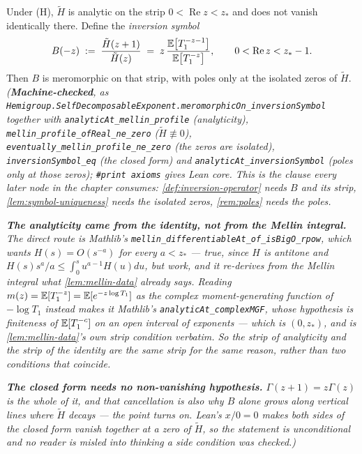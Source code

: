 \begin{lemma}\label{lem:inversion-symbol}
\leanok
Under (H), $\tilde H$ is analytic on the strip $0 < \operatorname{Re} z < z_*$ and does not
vanish identically there. Define the \emph{inversion symbol}
\[
  B(-z) \;:=\; \frac{\tilde H(z+1)}{\tilde H(z)}
  \;=\; z\,\frac{\mathbb{E}\bigl[T_1^{-z-1}\bigr]}{\mathbb{E}\bigl[T_1^{-z}\bigr]},
  \qquad 0 < \operatorname{Re} z < z_* - 1 .
\]
Then $B$ is meromorphic on that strip, with poles only at the isolated zeros of $\tilde H$.
\statusT\quad\emph{(\textbf{Machine-checked}, as
\texttt{Hemigroup.SelfDecomposableExponent.meromorphicOn\_inversionSymbol} together with
\texttt{analyticAt\_mellin\_profile} (analyticity),
\texttt{mellin\_profile\_ofReal\_ne\_zero} ($\tilde H \not\equiv 0$),
\texttt{eventually\_mellin\_profile\_ne\_zero} (the zeros are isolated),
\texttt{inversionSymbol\_eq} (the closed form) and
\texttt{analyticAt\_inversionSymbol} (poles only at those zeros);
\texttt{\#print axioms} gives Lean core. This is the clause every later
node in the chapter consumes: \ref{def:inversion-operator} needs $B$ and its strip,
\ref{lem:symbol-uniqueness} needs the isolated zeros, \ref{rem:poles} needs the poles.}

\emph{\textbf{The analyticity came from the identity, not from the Mellin integral.} The direct
route is Mathlib's \texttt{mellin\_differentiableAt\_of\_isBigO\_rpow}, which wants
$H(s) = O(s^{-a})$ for every $a < z_*$ --- true, since $H$ is antitone and
$H(s)s^a/a \le \int_0^s u^{a-1}H(u)du$, but work, and it re-derives from the Mellin integral what
\ref{lem:mellin-data} already says. Reading $m(z) = \mathbb{E}[T_1^{-z}] = \mathbb{E}[e^{-z\log T_1}]$ as the
complex moment-generating function of $-\log T_1$ instead makes it Mathlib's
\texttt{analyticAt\_complexMGF}, whose hypothesis is finiteness of $\mathbb{E}[T_1^{-c}]$ on an open
interval of exponents --- which is $(0, z_*)$, and is \ref{lem:mellin-data}'s own strip condition
verbatim. So the strip of analyticity and the strip of the identity are the \emph{same} strip for
the \emph{same} reason, rather than two conditions that coincide.}

\emph{\textbf{The closed form needs no non-vanishing hypothesis.} $\Gamma(z+1) = z\Gamma(z)$ is the
whole of it, and that cancellation is also why $B$ alone grows along vertical lines where
$\tilde H$ decays --- the point  turns on. Lean's $x/0 = 0$ makes both sides of the
closed form vanish together at a zero of $\tilde H$, so the statement is unconditional and no
reader is misled into thinking a side condition was checked.)}
\end{lemma}

